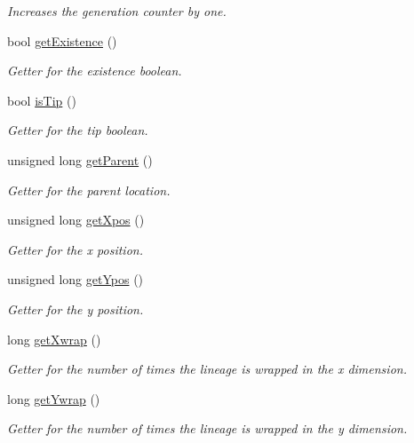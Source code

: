 \begin{DoxyCompactItemize}
\begin{DoxyCompactList}\small\item\em Increases the generation counter by one. \end{DoxyCompactList}\item 
bool \hyperlink{class_tree_node_a9d9336ac6e4157c8618c40eb43ddb948}{get\+Existence} ()
\begin{DoxyCompactList}\small\item\em Getter for the existence boolean. \end{DoxyCompactList}\item 
bool \hyperlink{class_tree_node_a469a21919177bd1161f9bfa3c13bd148}{is\+Tip} ()
\begin{DoxyCompactList}\small\item\em Getter for the tip boolean. \end{DoxyCompactList}\item 
unsigned long \hyperlink{class_tree_node_a8115342188f03eeaace4573531fdbfc2}{get\+Parent} ()
\begin{DoxyCompactList}\small\item\em Getter for the parent location. \end{DoxyCompactList}\item 
unsigned long \hyperlink{class_tree_node_a64333707f61650c168e4fb56bde1f95c}{get\+Xpos} ()
\begin{DoxyCompactList}\small\item\em Getter for the x position. \end{DoxyCompactList}\item 
unsigned long \hyperlink{class_tree_node_a37a2d729519175d8a509e616256d8d1a}{get\+Ypos} ()
\begin{DoxyCompactList}\small\item\em Getter for the y position. \end{DoxyCompactList}\item 
long \hyperlink{class_tree_node_a97967c939c284e38c2471a16063d6f58}{get\+Xwrap} ()
\begin{DoxyCompactList}\small\item\em Getter for the number of times the lineage is wrapped in the x dimension. \end{DoxyCompactList}\item 
long \hyperlink{class_tree_node_a9111da13a5d750d2a38c0e3f4a7d7a5a}{get\+Ywrap} ()
\begin{DoxyCompactList}\small\item\em Getter for the number of times the lineage is wrapped in the y dimension. \end{DoxyCompactList}\item 

\end{DoxyCompactItemize}
